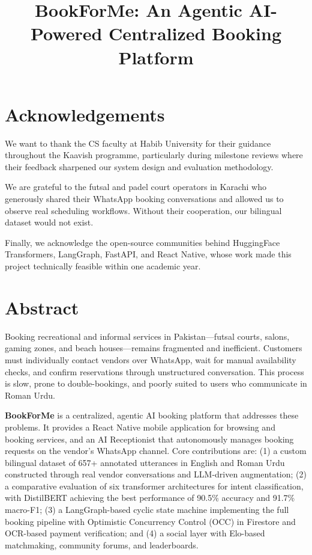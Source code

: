 \documentclass[12pt,oneside]{report}
\title{BookForMe: An Agentic AI-Powered Centralized Booking Platform}
\begin{document}


\chapter*{Acknowledgements}
We want to thank the CS faculty at Habib University for their guidance throughout
the Kaavish programme, particularly during milestone reviews where their feedback
sharpened our system design and evaluation methodology.

We are grateful to the futsal and padel court operators in Karachi who generously
shared their WhatsApp booking conversations and allowed us to observe real scheduling
workflows.  Without their cooperation, our bilingual dataset would not exist.

Finally, we acknowledge the open-source communities
behind HuggingFace Transformers, LangGraph, FastAPI, and React Native, whose work
made this project technically feasible within one academic year.

\chapter*{Abstract}
Booking recreational and informal services in Pakistan---futsal courts, salons,
gaming zones, and beach houses---remains fragmented and inefficient.  Customers must
individually contact vendors over WhatsApp, wait for manual availability checks, and
confirm reservations through unstructured conversation.  This process is slow, prone
to double-bookings, and poorly suited to users who communicate in Roman Urdu.

\textbf{BookForMe} is a centralized, agentic AI booking platform that addresses
these problems.  It provides a React Native mobile application for browsing and
booking services, and an AI Receptionist that autonomously manages booking requests
on the vendor's WhatsApp channel.  Core contributions are: (1) a custom bilingual
dataset of 657+ annotated utterances in English and Roman Urdu constructed through
real vendor conversations and LLM-driven augmentation; (2) a comparative evaluation
of six transformer architectures for intent classification, with DistilBERT achieving
the best performance of 90.5\% accuracy and 91.7\% macro-F1; (3) a LangGraph-based
cyclic state machine implementing the full booking pipeline with Optimistic
Concurrency Control (OCC) in Firestore and OCR-based payment verification; and (4) a
social layer with Elo-based matchmaking, community forums, and leaderboards.
\end{document}
